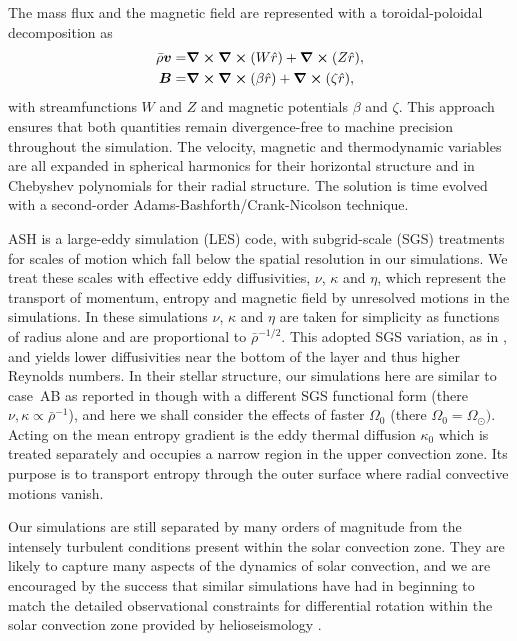 The mass flux and the magnetic field are represented with a
toroidal-poloidal decomposition as
\begin{eqnarray}
  \bar{\rho}\boldsymbol{v} =& \boldsymbol{\nabla}\boldsymbol{\times}\boldsymbol{\nabla}\boldsymbol{\times}(W \hat{r}) + \boldsymbol{\nabla}\boldsymbol{\times}(Z\hat{r}), \\
            \boldsymbol{B} =& \boldsymbol{\nabla}\boldsymbol{\times}\boldsymbol{\nabla}\boldsymbol{\times}(\beta \hat{r}) + \boldsymbol{\nabla}\boldsymbol{\times}(\zeta\hat{r}),
\end{eqnarray}
with streamfunctions $W$ and $Z$ and magnetic potentials $\beta$ and $\zeta$.
This approach ensures that both quantities remain divergence-free to
machine precision throughout the simulation.  The velocity, magnetic
and thermodynamic variables are all expanded in spherical harmonics
for their horizontal structure and in Chebyshev polynomials for their
radial structure.  The solution is time evolved with a second-order
Adams-Bashforth/Crank-Nicolson technique.

ASH is a large-eddy simulation (LES) code, with subgrid-scale (SGS)
treatments for scales of motion which fall below the spatial resolution in our
simulations.  We treat these scales with effective eddy diffusivities,
$\nu$, $\kappa$ and $\eta$, which represent the transport of momentum,
entropy and magnetic field by unresolved motions in the simulations. 
In these simulations $\nu$, $\kappa$ and $\eta$ are
taken for simplicity as functions of radius alone and are proportional
to $\bar{\rho}^{-1/2}$.   
This adopted SGS variation, as in \cite{Brun_et_al_2004},
\cite{Browning_et_al_2006} and \cite{Ballot_et_al_2007} 
yields lower diffusivities near the bottom of the layer and thus
higher Reynolds numbers. In their stellar structure, our simulations here
are similar to case~AB as reported in \cite{Brun&Toomre_2002} though with a
different SGS functional form (there $\nu, \kappa \propto \bar{\rho}^{-1}$),
and here we shall consider the effects of faster $\Omega_0$ (there
$\Omega_0 = \Omega_\odot)$.  Acting on the mean entropy gradient is
the eddy thermal diffusion $\kappa_0$ which is treated separately and
occupies a narrow region in the upper convection zone.  Its purpose is
to transport entropy through the outer surface where radial convective
motions vanish.  

Our simulations are still separated
by many orders of magnitude from the intensely turbulent conditions
present within the solar convection zone.  They are
likely to capture many aspects of the dynamics of solar convection, and
we are encouraged by the success that similar simulations 
\citep[e.g.,][]{Miesch_et_al_2000,Brun&Toomre_2002,Miesch_et_al_2006,Miesch_et_al_2008}
have had in beginning to match the detailed observational constraints for
differential rotation within the solar convection zone provided by
helioseismology \citep[c.f.\ ][]{Thompson_et_al_2003}.


